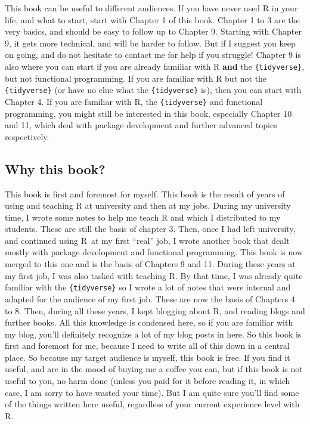 \documentclass[]{gitbook}
\theoremstyle{definition}
\theoremstyle{definition}
\theoremstyle{definition}
\theoremstyle{remark}
\begin{document}
This book can be useful to different audiences. If you have never used R
in your life, and what to start, start with Chapter 1 of this book.
Chapter 1 to 3 are the very basics, and should be easy to follow up to
Chapter 9. Starting with Chapter 9, it gets more technical, and will be
harder to follow. But if I suggest you keep on going, and do not
hesitate to contact me for help if you struggle! Chapter 9 is also where
you can start if you are already familiar with R \textbf{and} the
\texttt{\{tidyverse\}}, but not functional programming. If you are
familiar with R but not the \texttt{\{tidyverse\}} (or have no clue what
the \texttt{\{tidyverse\}} is), then you can start with Chapter 4. If
you are familiar with R, the \texttt{\{tidyverse\}} and functional
programming, you might still be interested in this book, especially
Chapter 10 and 11, which deal with package development and further
advanced topics respectively.

\hypertarget{why-this-book}{%
\subsection*{Why this book?}\label{why-this-book}}

This book is first and foremost for myself. This book is the result of
years of using and teaching R at university and then at my jobs. During
my university time, I wrote some notes to help me teach R and which I
distributed to my students. These are still the basis of chapter 3.
Then, once I had left university, and continued using R~at my first
``real'' job, I wrote another book that dealt mostly with package
development and functional programming. This book is now merged to this
one and is the basis of Chapters 9 and 11. During these years at my
first job, I was also tasked with teaching R. By that time, I was
already quite familiar with the \texttt{\{tidyverse\}} so I wrote a lot
of notes that were internal and adapted for the audience of my first
job. These are now the basis of Chapters 4 to 8. Then, during all these
years, I kept blogging about R, and reading blogs and further books. All
this knowledge is condensed here, so if you are familiar with my blog,
you'll definitely recognize a lot of my blog posts in here. So this book
is first and foremost for me, because I need to write all of this down
in a central place. So because my target audience is myself, this book
is free. If you find it useful, and are in the mood of buying me a
coffee you can, but if this book is not useful to you, no harm done
(unless you paid for it before reading it, in which case, I am sorry to
have wasted your time). But I am quite sure you'll find some of the
things written here useful, regardless of your current experience level
with R.
\end{document}

